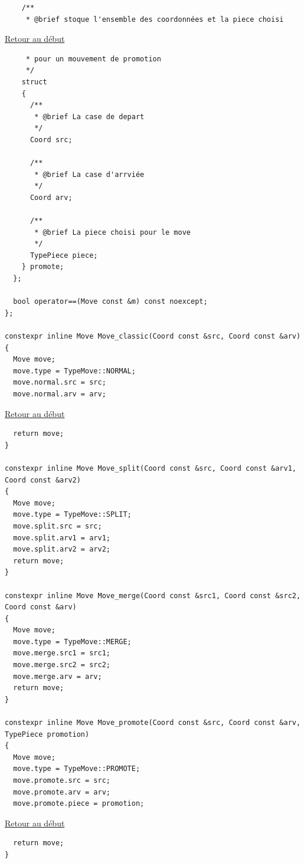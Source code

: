 {\begin{frame}[fragile]
\begin{verbatim}
    /**
     * @brief stoque l'ensemble des coordonnées et la piece choisi
\end{verbatim}
\end{frame}

\begin{frame}[fragile]
\hyperlink{conclusion}{Retour au début}\newline
\begin{verbatim}
     * pour un mouvement de promotion
     */
    struct
    {
      /**
       * @brief La case de depart
       */
      Coord src;

      /**
       * @brief La case d'arrviée
       */
      Coord arv;

      /**
       * @brief La piece choisi pour le move
       */
      TypePiece piece;
    } promote;
  };

  bool operator==(Move const &m) const noexcept;
};

constexpr inline Move Move_classic(Coord const &src, Coord const &arv)
{
  Move move;
  move.type = TypeMove::NORMAL;
  move.normal.src = src;
  move.normal.arv = arv;
\end{verbatim}
\end{frame}

\begin{frame}[fragile]
\hyperlink{conclusion}{Retour au début}\newline
\begin{verbatim}
  return move;
}

constexpr inline Move Move_split(Coord const &src, Coord const &arv1, Coord const &arv2)
{
  Move move;
  move.type = TypeMove::SPLIT;
  move.split.src = src;
  move.split.arv1 = arv1;
  move.split.arv2 = arv2;
  return move;
}

constexpr inline Move Move_merge(Coord const &src1, Coord const &src2, Coord const &arv)
{
  Move move;
  move.type = TypeMove::MERGE;
  move.merge.src1 = src1;
  move.merge.src2 = src2;
  move.merge.arv = arv;
  return move;
}

constexpr inline Move Move_promote(Coord const &src, Coord const &arv, TypePiece promotion)
{
  Move move;
  move.type = TypeMove::PROMOTE;
  move.promote.src = src;
  move.promote.arv = arv;
  move.promote.piece = promotion;
\end{verbatim}
\end{frame}

\begin{frame}[fragile]
\hyperlink{conclusion}{Retour au début}\newline
\begin{verbatim}
  return move;
}



\end{verbatim}
\end{frame}}
